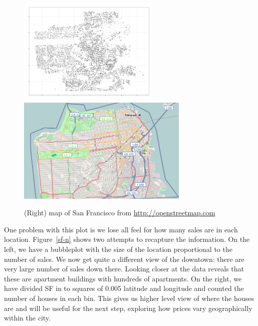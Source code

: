 \documentclass[oneside]{article}
\begin{document}
\begin{figure}[htbp]
  \centering
  \includegraphics[height=2in]{sf-geo}%
  \includegraphics[height=2in]{sf-map}
  \caption{(Right) map of San Francisco from \url{http://openstreetmap.com}}
  \label{fig:sf-geo}
\end{figure}

One problem with this plot is we lose all feel for how many sales are in each location.  Figure~\ref{sf-n} shows two attempts to recapture the information.  On the left, we have a bubbleplot with the size of the location proportional to the number of sales.  We now get quite a different view of the downtown: there are very large number of sales down there.  Looking closer at the data reveals that these are apartment buildings with hundreds of apartments.  On the right, we have divided SF in to squares of 0.005 latitude and longitude and counted the number of houses in each bin.  This gives us higher level view of where the houses are and will be useful for the next step, exploring how prices vary geographically within the city.
\end{document}
